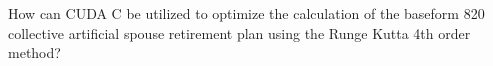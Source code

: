 
How can CUDA C be utilized to optimize the calculation of the baseform 820 collective artificial spouse retirement plan using the Runge Kutta 4th order method?